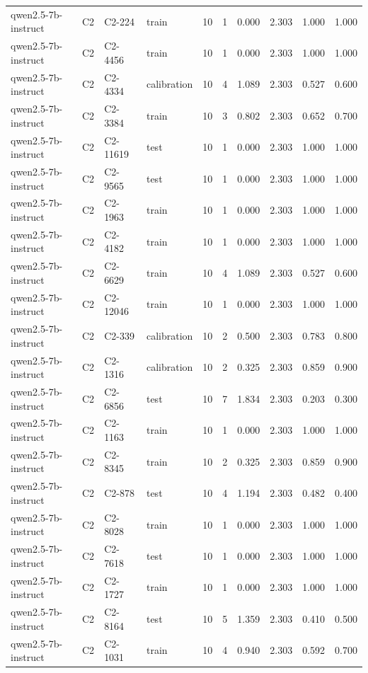 \begin{table}
\begin{tabular}{llllrrrrrr}
qwen2.5-7b-instruct & C2 & C2-224 & train & 10 & 1 & 0.000 & 2.303 & 1.000 & 1.000 \\
qwen2.5-7b-instruct & C2 & C2-4456 & train & 10 & 1 & 0.000 & 2.303 & 1.000 & 1.000 \\
qwen2.5-7b-instruct & C2 & C2-4334 & calibration & 10 & 4 & 1.089 & 2.303 & 0.527 & 0.600 \\
qwen2.5-7b-instruct & C2 & C2-3384 & train & 10 & 3 & 0.802 & 2.303 & 0.652 & 0.700 \\
qwen2.5-7b-instruct & C2 & C2-11619 & test & 10 & 1 & 0.000 & 2.303 & 1.000 & 1.000 \\
qwen2.5-7b-instruct & C2 & C2-9565 & test & 10 & 1 & 0.000 & 2.303 & 1.000 & 1.000 \\
qwen2.5-7b-instruct & C2 & C2-1963 & train & 10 & 1 & 0.000 & 2.303 & 1.000 & 1.000 \\
qwen2.5-7b-instruct & C2 & C2-4182 & train & 10 & 1 & 0.000 & 2.303 & 1.000 & 1.000 \\
qwen2.5-7b-instruct & C2 & C2-6629 & train & 10 & 4 & 1.089 & 2.303 & 0.527 & 0.600 \\
qwen2.5-7b-instruct & C2 & C2-12046 & train & 10 & 1 & 0.000 & 2.303 & 1.000 & 1.000 \\
qwen2.5-7b-instruct & C2 & C2-339 & calibration & 10 & 2 & 0.500 & 2.303 & 0.783 & 0.800 \\
qwen2.5-7b-instruct & C2 & C2-1316 & calibration & 10 & 2 & 0.325 & 2.303 & 0.859 & 0.900 \\
qwen2.5-7b-instruct & C2 & C2-6856 & test & 10 & 7 & 1.834 & 2.303 & 0.203 & 0.300 \\
qwen2.5-7b-instruct & C2 & C2-1163 & train & 10 & 1 & 0.000 & 2.303 & 1.000 & 1.000 \\
qwen2.5-7b-instruct & C2 & C2-8345 & train & 10 & 2 & 0.325 & 2.303 & 0.859 & 0.900 \\
qwen2.5-7b-instruct & C2 & C2-878 & test & 10 & 4 & 1.194 & 2.303 & 0.482 & 0.400 \\
qwen2.5-7b-instruct & C2 & C2-8028 & train & 10 & 1 & 0.000 & 2.303 & 1.000 & 1.000 \\
qwen2.5-7b-instruct & C2 & C2-7618 & test & 10 & 1 & 0.000 & 2.303 & 1.000 & 1.000 \\
qwen2.5-7b-instruct & C2 & C2-1727 & train & 10 & 1 & 0.000 & 2.303 & 1.000 & 1.000 \\
qwen2.5-7b-instruct & C2 & C2-8164 & test & 10 & 5 & 1.359 & 2.303 & 0.410 & 0.500 \\
qwen2.5-7b-instruct & C2 & C2-1031 & train & 10 & 4 & 0.940 & 2.303 & 0.592 & 0.700 \\

\end{tabular}
\end{table}
